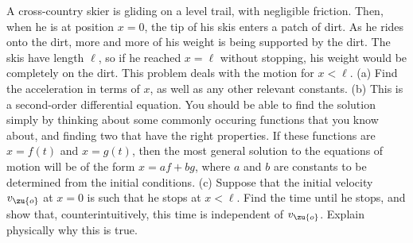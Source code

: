 A cross-country skier is gliding on a level trail, with negligible friction.
Then, when he is at position $x=0$, the tip of his skis enters a patch of
dirt. As he rides onto the dirt, more and more of his weight is being supported
by the dirt. The skis have length $\ell$, so if he reached $x=\ell$ without stopping,
his weight would be completely on the dirt.
This problem deals with the motion for $x<\ell$.
(a) Find the acceleration in terms of $x$, as well as any other relevant constants.\hwendpart
(b) This is a second-order differential equation. You should be able to find the
solution simply by thinking about some commonly occuring functions that you know
about, and finding two that have the right properties. If these functions are $x=f(t)$ and
$x=g(t)$, then the most general solution to the equations of motion will be of the
form $x=af+bg$, where $a$ and $b$ are constants to be determined from the initial conditions.\hwendpart
(c) Suppose that the initial velocity $v_\zu{o}$ at $x=0$ is such that he stops at $x<\ell$.
Find the time until he stops, and show that, counterintuitively, this time is independent of $v_\zu{o}$.
Explain physically why this is true.\answercheck\hwendpart
